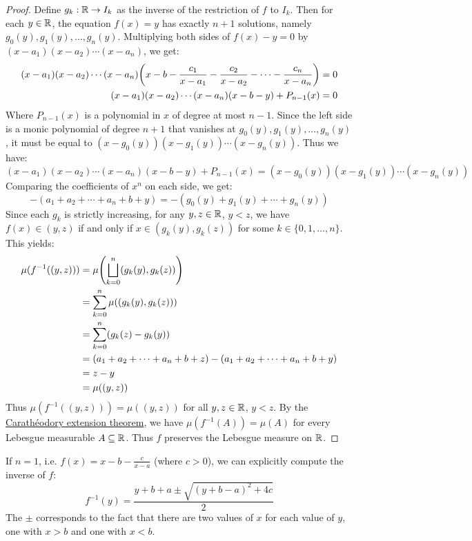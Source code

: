 \documentclass[main.tex]{subfiles}
\begin{document}
\begin{proof}
    Define $g_k:\R\to I_k$ as the inverse of the restriction of $f$ to $I_k$. Then for each $y\in\R$, the equation $f(x)=y$ has exactly $n+1$ solutions, namely $g_0(y),g_1(y),\ldots,g_n(y)$. Multiplying both sides of $f(x)-y=0$ by $(x-a_1)(x-a_2)\cdots(x-a_n)$, we get:
    \begin{align*}
        (x-a_1)(x-a_2)\cdots(x-a_n)\qty(x-b-\frac{c_1}{x-a_1}-\frac{c_2}{x-a_2}-\cdots-\frac{c_n}{x-a_n}) &= 0 \\
        (x-a_1)(x-a_2)\cdots(x-a_n)(x-b-y) + P_{n-1}(x) &= 0
    \end{align*}
    Where $P_{n-1}(x)$ is a polynomial in $x$ of degree at most $n-1$. Since the left side is a monic polynomial of degree $n+1$ that vanishes at $g_0(y),g_1(y),\ldots,g_n(y)$, it must be equal to $(x-g_0(y))(x-g_1(y))\cdots(x-g_n(y))$. Thus we have:
    \begin{equation*}
        (x-a_1)(x-a_2)\cdots(x-a_n)(x-b-y) + P_{n-1}(x)
        = (x-g_0(y))(x-g_1(y))\cdots(x-g_n(y))
    \end{equation*}
    Comparing the coefficients of $x^n$ on each side, we get:
    \begin{equation*}
        -(a_1+a_2+\cdots+a_n+b+y) = -(g_0(y)+g_1(y)+\cdots+g_n(y))
    \end{equation*}
    Since each $g_k$ is strictly increasing, for any $y,z\in\R$, $y<z$, we have $f(x)\in(y,z)$ if and only if $x\in(g_k(y),g_k(z))$ for some $k\in\{0,1,\ldots,n\}$. This yields:
    \begin{align*}
        \mu(f^{-1}((y,z)))
        &= \mu\qty(\bigsqcup_{k=0}^n (g_k(y),g_k(z))) \\
        &= \sum_{k=0}^n \mu((g_k(y),g_k(z))) \\
        &= \sum_{k=0}^n (g_k(z)-g_k(y)) \\
        &= (a_1+a_2+\cdots+a_n+b+z)-(a_1+a_2+\cdots+a_n+b+y) \\
        &= z-y \\
        &= \mu((y,z))
    \end{align*}
    Thus $\mu(f^{-1}((y,z)))=\mu((y,z))$ for all $y,z\in\R$, $y<z$. By the \href{https://en.wikipedia.org/wiki/Carath%C3%A9odory%27s_extension_theorem}{Carathéodory extension theorem}, we have $\mu(f^{-1}(A))=\mu(A)$ for every Lebesgue measurable $A\sub\R$. Thus $f$ preserves the Lebesgue measure on $\R$.
\end{proof}
\begin{remark}
    If $n=1$, i.e. $f(x)=x-b-\frac{c}{x-a}$ (where $c>0$), we can explicitly compute the inverse of $f$:
    \begin{equation*}
        f^{-1}(y) = \frac{y+b+a\pm\sqrt{(y+b-a)^2+4c}}{2}
    \end{equation*}
    The $\pm$ corresponds to the fact that there are two values of $x$ for each value of $y$, one with $x>b$ and one with $x<b$.
\end{remark}
\end{document}
